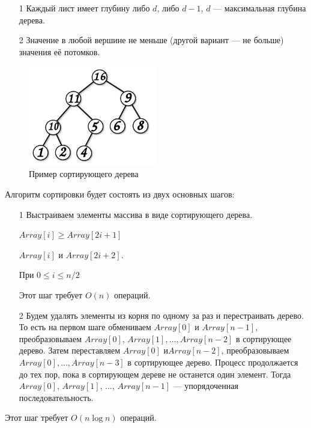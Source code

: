 \documentclass{book}
\begin{document}
\begin{enumerate}

    \item[1] Каждый лист имеет глубину либо $d$, либо $d-1$, $d$ --- максимальная глубина дерева.
    \item[2] Значение в любой вершине не меньше (другой вариант — не больше) значения её потомков.
\end{enumerate}


\begin{figure}[h]

\centering
\includegraphics[width=0.5\textwidth]{pics/333px-Сортирующее_дерево.svg.png}
\caption{Пример сортирующего дерева}
\end{figure}

Алгоритм сортировки будет состоять из двух основных шагов:
\begin{enumerate}

    \item[1] Выстраиваем элементы массива в виде сортирующего дерева.\par
    $Array[i]\geqslant Array[2i+1]$\par
    $Array[i]$ и $Array[2i+2]$.\par
    При $0\leqslant i \leqslant n/2$\par
    Этот шаг требует $O(n)$ операций.
    \item[2]  Будем удалять элементы из корня по одному за раз и перестраивать дерево. То есть на первом шаге обмениваем $Array[0]$ и $Array[n-1]$, преобразовываем $Array[0]$, $Array[1],\ldots , Array[n-2]$ в сортирующее дерево. Затем переставляем $Array[0]$ и\linebreak $Array[n-2]$, преобразовываем $Array[0],\ldots, Array[n-3]$ в сортирующее дерево. Процесс продолжается до тех пор, пока в сортирующем дереве не останется один элемент. Тогда $Array[0]$, $Array[1]$, $\ldots$, $Array[n-1]$ --- упорядоченная последовательность.
\end{enumerate}
Этот шаг требует $O(n\log n)$ операций.
\end{document}
